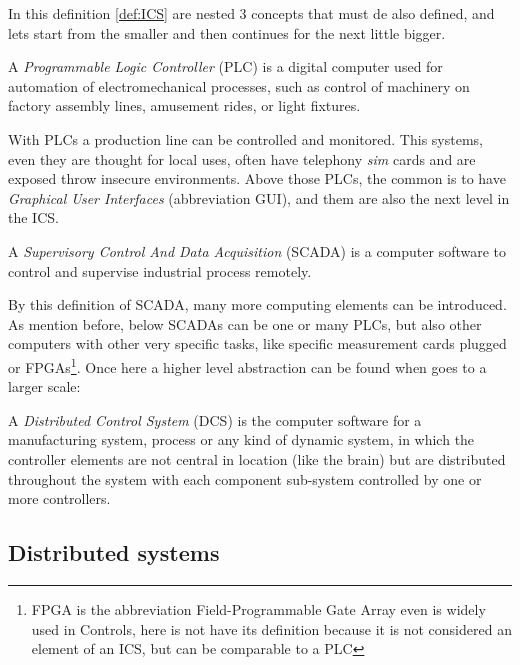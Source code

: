 \documentclass[10pt,a4paper,twoside]{llncs}
\begin{document}
In this definition \ref{def:ICS} are nested 3 concepts that must de also defined, and lets start from the smaller and then continues for the next little bigger.

\begin{definition}\label{def:PLC}
    A \emph{Programmable Logic Controller} (PLC) is a digital computer used for automation of electromechanical processes, such as control of machinery on factory assembly lines, amusement rides, or light fixtures.
\end{definition}

With PLCs a production line can be controlled and monitored. This systems, even they are thought for local uses, often have telephony \emph{sim} cards and are exposed throw insecure environments. Above those PLCs, the common is to have \emph{Graphical User Interfaces} (abbreviation GUI), and them are also the next level in the ICS.

\begin{definition}\label{def:SCADA}
    A \emph{Supervisory Control And Data Acquisition} (SCADA) is a computer software to control and supervise industrial process remotely.
\end{definition}

By this definition of SCADA, many more computing elements can be introduced. As mention before, below SCADAs can be one or many PLCs, but also other computers with other very specific tasks, like specific measurement cards plugged or FPGAs\footnote{FPGA is the abbreviation Field-Programmable Gate Array even is widely used in Controls, here is not have its definition because it is not considered an element of an ICS, but can be comparable to a PLC}. Once here a higher level abstraction can be found when goes to a larger scale:

\begin{definition}\label{def:DCS}
    A \emph{Distributed Control System} (DCS) is the computer software for a manufacturing system, process or any kind of dynamic system, in which the controller elements are not central in location (like the brain) but are distributed throughout the system with each component sub-system controlled by one or more controllers.
\end{definition}

\subsection{Distributed systems}\label{sec:DistrSys}
\end{document}
